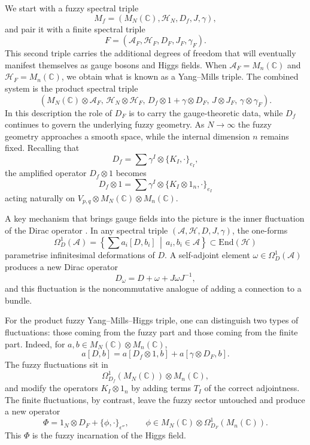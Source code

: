 \documentclass[11pt]{article}
\theoremstyle{plain}
\begin{document}
We start with a fuzzy spectral triple
\[
M_f = (M_N(\mathbb{C}), \mathcal{H}_N, D_f, J, \gamma),
\]
and pair it with a finite spectral triple
\[
F = (\mathcal{A}_F, \mathcal{H}_F, D_F, J_F, \gamma_F).
\]
This second triple carries the additional degrees of freedom that will eventually manifest
themselves as gauge bosons and Higgs fields.  
When $\mathcal{A}_F = M_n(\mathbb{C})$ and $\mathcal{H}_F = M_n(\mathbb{C})$, we obtain what
is known as a Yang--Mills triple.  
The combined system is the product spectral triple
\[
\left(
M_N(\mathbb{C}) \otimes \mathcal{A}_F,\,
\mathcal{H}_N \otimes \mathcal{H}_F,\,
D_f \otimes 1 + \gamma \otimes D_F,\,
J \otimes J_F,\,
\gamma \otimes \gamma_F
\right).
\]
In this description the role of $D_F$ is to carry the gauge-theoretic data, while $D_f$
continues to govern the underlying fuzzy geometry.  
As $N \to \infty$ the fuzzy geometry approaches a smooth space, while the internal dimension
$n$ remains fixed.  
Recalling that
\[
D_f = \sum \gamma^I \otimes \{ K_I, \cdot \}_{e_I},
\]
the amplified operator $D_f \otimes 1$ becomes
\[
D_f \otimes 1 = \sum \gamma^I \otimes \{ K_I \otimes 1_n, \cdot \}_{e_I}
\]
acting naturally on $V_{p,q} \otimes M_N(\mathbb{C}) \otimes M_n(\mathbb{C})$.

\medskip


A key mechanism that brings gauge fields into the picture is the inner fluctuation of the
Dirac operator \cite{Connes Inner Fluctuations}.  
In any spectral triple $(\mathcal{A},\mathcal{H},D,J,\gamma)$, the one-forms
\[
\Omega^1_D(\mathcal{A}) = 
\left\{ \sum a_i[D,b_i] \,\middle|\, a_i,b_i \in \mathcal{A} \right\}
\subset \mathrm{End}(\mathcal{H})
\]
parametrise infinitesimal deformations of $D$.  
A self-adjoint element $\omega \in \Omega^1_D(\mathcal{A})$ produces a new Dirac operator
\[
D_\omega = D + \omega + J\omega J^{-1},
\]
and this fluctuation is the noncommutative analogue of adding a connection to a bundle.

For the product fuzzy Yang--Mills--Higgs triple, one can distinguish two types of
fluctuations: those coming from the fuzzy part and those coming from the finite part.
Indeed, for $a,b \in M_N(\mathbb{C}) \otimes M_n(\mathbb{C})$,
\[
a[D,b] = a[D_f \otimes 1, b] + a[\gamma \otimes D_F, b].
\]
The fuzzy fluctuations sit in
\[
\Omega^1_{D_f}(M_N(\mathbb{C})) \otimes M_n(\mathbb{C}),
\]
and modify the operators $K_I \otimes 1_n$ by adding terms $T_I$ of the correct adjointness.
The finite fluctuations, by contrast, leave the fuzzy sector untouched and produce a new
operator
\[
\Phi = 1_N \otimes D_F + \{\phi, \cdot\}_{\epsilon''},
\qquad 
\phi \in M_N(\mathbb{C}) \otimes \Omega^1_{D_F}(M_n(\mathbb{C})).
\]
This $\Phi$ is the fuzzy incarnation of the Higgs field.
\end{document}
